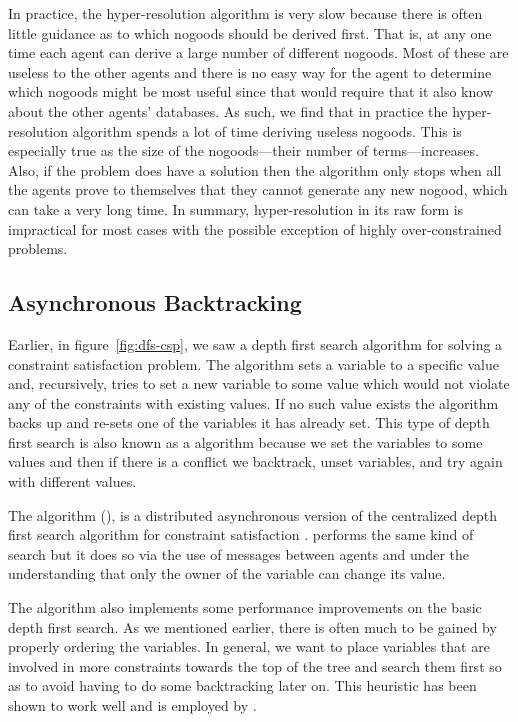In practice, the hyper-resolution algorithm is very slow because there
is often little guidance as to which nogoods should be derived first.
That is, at any one time each agent can derive a large number of
different nogoods. Most of these are useless to the other agents and
there is no easy way for the agent to determine which nogoods might be
most useful since that would require that it also know about the other
agents' databases. As such, we find that in practice the
hyper-resolution algorithm spends a lot of time deriving useless
nogoods. This is especially true as the size of the nogoods---their
number of terms---increases. Also, if the problem does have a solution
then the algorithm only stops when all the agents prove to themselves
that they cannot generate any new nogood, which can take a very long
time. In summary, hyper-resolution in its raw form is impractical for
most cases with the possible exception of highly over-constrained
problems.

\subsection{Asynchronous Backtracking}

Earlier, in figure~\ref{fig:dfs-csp}, we saw a depth first search
algorithm for solving a constraint satisfaction problem. The algorithm
sets a variable to a specific value and, recursively, tries to set a
new variable to some value which would not violate any of the
constraints with existing values. If no such value exists the
algorithm backs up and re-sets one of the variables it has already
set. This type of depth first search is also known as a
 algorithm because we set the variables to some
values and then if there is a conflict we backtrack, unset
variables, and try again with different values.

The  algorithm (),
is a distributed asynchronous version of the centralized depth first
search algorithm for constraint satisfaction \cite{yokoo00a}.
 performs the same kind of search but it does so via the use
of messages between agents and under the understanding that only the
owner of the variable can change its value.

The  algorithm also implements some performance improvements
on the basic depth first search. As we mentioned earlier, there is
often much to be gained by properly ordering the variables.  In
general, we want to place variables that are involved in more
constraints towards the top of the tree and search them first so as to
avoid having to do some backtracking later on. This heuristic has been
shown to work well and is employed by .

